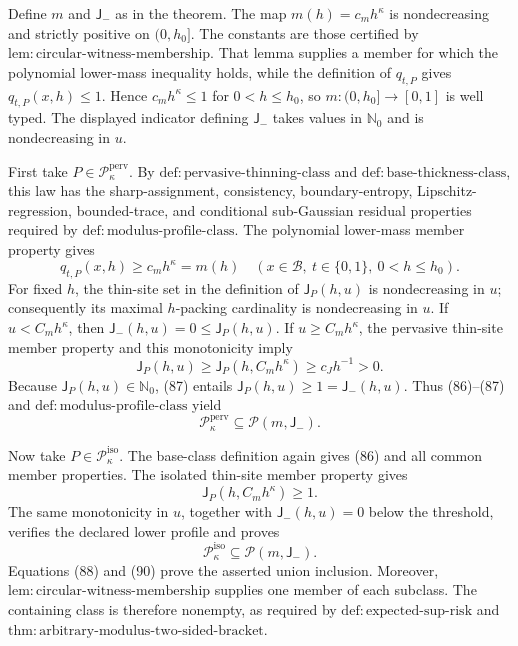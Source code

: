 Define \(m\) and \(\mathsf J_{-}\) as in the theorem.  The map
\(m(h)=c_mh^\kappa\) is nondecreasing and strictly positive on
\((0,h_0]\).  The constants are those certified by
\(\mathrm{lem:circular\text{-}witness\text{-}membership}\).  That lemma
supplies a member for which the polynomial lower-mass inequality holds,
while the definition of \(q_{t,P}\) gives \(q_{t,P}(x,h)\le1\).  Hence
\(c_mh^\kappa\le1\) for \(0<h\le h_0\), so
\(m:(0,h_0]\to[0,1]\) is well typed.  The displayed indicator defining
\(\mathsf J_{-}\) takes values in \(\mathbb N_0\) and is nondecreasing in
\(u\).

First take \(P\in\mathcal P_{\kappa}^{\mathrm{perv}}\).  By
\(\mathrm{def:pervasive\text{-}thinning\text{-}class}\) and
\(\mathrm{def:base\text{-}thickness\text{-}class}\), this law has the
sharp-assignment, consistency, boundary-entropy, Lipschitz-regression,
bounded-trace, and conditional sub-Gaussian residual properties required
by \(\mathrm{def:modulus\text{-}profile\text{-}class}\).  The polynomial
lower-mass member property gives
\[
 q_{t,P}(x,h)\ge c_mh^\kappa=m(h)
 \quad
 (x\in\mathcal B,\ t\in\{0,1\},\ 0<h\le h_0). \tag{86}
\]
For fixed \(h\), the thin-site set in the definition of
\(\mathsf J_P(h,u)\) is nondecreasing in \(u\); consequently its maximal
\(h\)-packing cardinality is nondecreasing in \(u\).  If
\(u<C_mh^\kappa\), then
\(\mathsf J_{-}(h,u)=0\le\mathsf J_P(h,u)\).  If
\(u\ge C_mh^\kappa\), the pervasive thin-site member property and this
monotonicity imply
\[
 \mathsf J_P(h,u)
 \ge\mathsf J_P(h,C_mh^\kappa)
 \ge c_Jh^{-1}>0. \tag{87}
\]
Because \(\mathsf J_P(h,u)\in\mathbb N_0\), (87) entails
\(\mathsf J_P(h,u)\ge1=\mathsf J_{-}(h,u)\).  Thus (86)--(87) and
\(\mathrm{def:modulus\text{-}profile\text{-}class}\) yield
\[
 \mathcal P_{\kappa}^{\mathrm{perv}}
 \subseteq\mathcal P(m,\mathsf J_{-}). \tag{88}
\]

Now take \(P\in\mathcal P_{\kappa}^{\mathrm{iso}}\).  The base-class
definition again gives (86) and all common member properties.  The
isolated thin-site member property gives
\[
 \mathsf J_P(h,C_mh^\kappa)\ge1. \tag{89}
\]
The same monotonicity in \(u\), together with
\(\mathsf J_{-}(h,u)=0\) below the threshold, verifies the declared lower
profile and proves
\[
 \mathcal P_{\kappa}^{\mathrm{iso}}
 \subseteq\mathcal P(m,\mathsf J_{-}). \tag{90}
\]
Equations (88) and (90) prove the asserted union inclusion.  Moreover,
\(\mathrm{lem:circular\text{-}witness\text{-}membership}\) supplies one
member of each subclass.  The containing class is therefore nonempty,
as required by \(\mathrm{def:expected\text{-}sup\text{-}risk}\) and
\(\mathrm{thm:arbitrary\text{-}modulus\text{-}two\text{-}sided\text{-}bracket}\).

